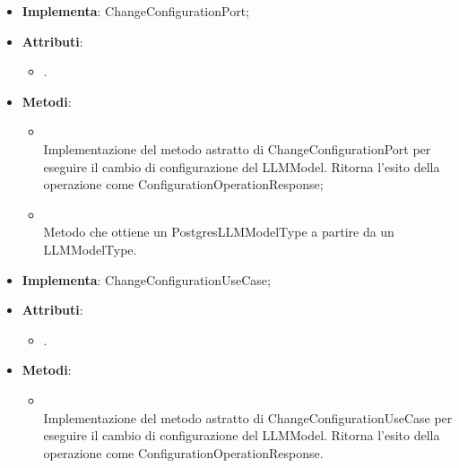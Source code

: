 \documentclass[10pt, a4paper]{article}
\begin{document}
\label{ChangeConfigurationPostgresDettaglio}
\begin{itemize}
    \item \textbf{Implementa}: ChangeConfigurationPort;
    \item \textbf{Attributi}:
    \begin{itemize}
        \item {}.
    \end{itemize}
    \item \textbf{Metodi}:
    \begin{itemize}
        \item {}\\
        Implementazione del metodo astratto di ChangeConfigurationPort per eseguire il cambio di configurazione del LLMModel. Ritorna l'esito della operazione come ConfigurationOperationResponse;
        \item {}\\
        Metodo che ottiene un PostgresLLMModelType a partire da un LLMModelType.
    \end{itemize}
\end{itemize}



\label{ChangeConfigurationServiceDettaglio}
\begin{itemize}
    \item \textbf{Implementa}: ChangeConfigurationUseCase;
    \item \textbf{Attributi}:
    \begin{itemize}
        \item {}.
    \end{itemize}
    \item \textbf{Metodi}:
    \begin{itemize}
        \item {}\\
        Implementazione del metodo astratto di ChangeConfigurationUseCase per eseguire il cambio di configurazione del LLMModel. Ritorna l'esito della operazione come ConfigurationOperationResponse.
    \end{itemize}
\end{itemize}
\end{document}
